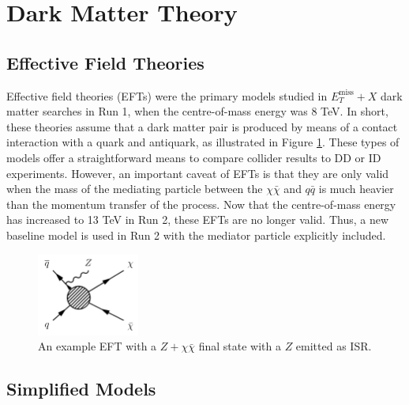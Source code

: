 \label{chapter:theory}

\section{Dark Matter Theory}

\subsection{Effective Field Theories}

Effective field theories (EFTs) were the primary models studied in $E_T^\text{miss}+X$ dark matter searches in Run 1, when the centre-of-mass energy was 8 TeV. In short, these theories assume that a dark matter pair is produced by means of a contact interaction with a quark and antiquark, as illustrated in Figure \ref{fig:eft}. These types of models offer a straightforward means to compare collider results to DD or ID experiments. However, an important caveat of EFTs is that they are only valid when the mass of the mediating particle between the $\chi\bar{\chi}$ and $q\bar{q}$ is much heavier than the momentum transfer of the process. Now that the centre-of-mass energy has increased to 13 TeV in Run 2, these EFTs are no longer valid. Thus, a new baseline model is used in Run 2 with the mediator particle explicitly included.

\begin{figure}[htb]
\centering
\includegraphics[width=0.3\textwidth]{Figures/eft.png}
\caption{An example EFT with a $Z+\chi\bar{\chi}$ final state with a $Z$ emitted as ISR.}
\label{fig:eft}
\end{figure}

\subsection{Simplified Models}

